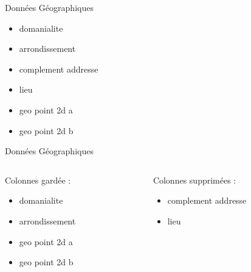 \documentclass{beamer}
\begin{document}
\begin{frame}{Données Géographiques}
	\begin{itemize}
		\item domanialite
		\item arrondissement
		\item complement addresse
		\item lieu
		\item geo point 2d a
		\item geo point 2d b
	\end{itemize}
\end{frame}
\begin{frame}{Données Géographiques}
	\begin{columns}
	\begin{column}{0.5\textwidth}
		Colonnes gardée :\\
		\begin{itemize}
			\item domanialite
			\item arrondissement
			\item geo point 2d a
			\item geo point 2d b
		\end{itemize}
	\end{column}
	\begin{column}{0.5\textwidth}
		Colonnes supprimées :\\
		\begin{itemize}
			\item complement addresse
			\item lieu
		\end{itemize}
	\end{column}
	\end{columns}
\end{frame}
\end{document}
